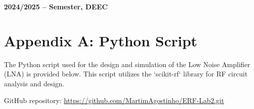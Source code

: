 \documentclass[12pt]{article}
\begin{document}

\vspace{5cm}

\begin{center}
    \large \bf 2024/2025 --  Semester, DEEC
\end{center}

\thispagestyle{empty}

\setcounter{page}{0}

\newpage

\newpage

\tableofcontents %

\newpage

\listoffigures

\newpage

%










\newpage


\newpage
\appendix
\section{Appendix A: Python Script}

The Python script used for the design and simulation of the Low Noise Amplifier (LNA) is provided below. This script utilizes the `scikit-rf` library for RF circuit analysis and design.

GitHub repository: \url{https://github.com/MartimAgostinho/ERF-Lab2.git}
\label{appendix:python_script}
\end{document}
